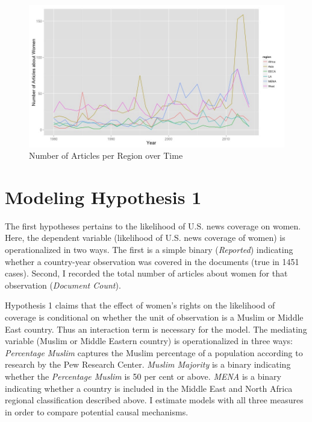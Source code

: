 \documentclass[11pt, oneside]{article}
\begin{document}
\begin{figure}[h]
\caption{Number of Articles per Region over Time}\label{fig:n-region}
\includegraphics[scale=0.55]{n-region-plot}
\end{figure}


\section{Modeling Hypothesis 1}

The first hypotheses pertains to the likelihood of U.S. news coverage on women. Here, the dependent variable (likelihood of U.S. news coverage of women) is operationalized in two ways. The first is a simple binary (\emph{Reported}) indicating whether a country-year observation was covered in the documents (true in 1451 cases). Second, I recorded the total number of articles about women for that observation (\emph{Document Count}). 

Hypothesis 1 claims that the effect of women's rights on the likelihood of coverage is conditional on whether the unit of observation is a Muslim or Middle East country. Thus an interaction term is necessary for the model. The mediating variable (Muslim or Middle Eastern country) is operationalized in three ways: \emph{Percentage Muslim} captures the Muslim percentage of a population according to research by the Pew Research Center. \emph{Muslim Majority} is a binary indicating whether the \emph{Percentage Muslim} is 50 per cent or above. \emph{MENA} is a binary indicating whether a country is included in the Middle East and North Africa regional classification described above. I estimate models with all three measures in order to compare potential causal mechanisms. 
\end{document}
